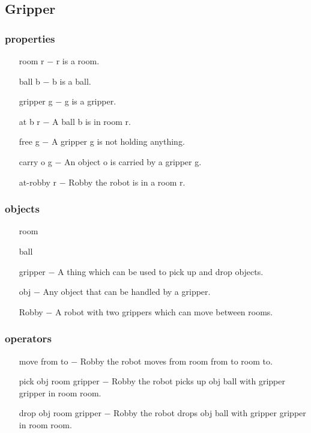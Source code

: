 \documentclass[a4paper]{article}
\begin{document}
\subsection*{Gripper}
\subsubsection*{properties}
\begin{itemize}
\item [room r $-$] r is a room.
\item [ball b $-$] b is a ball.
\item [gripper g $-$] g is a gripper.
\item[at b r $-$] A ball b is in room r.
\item[free g $-$] A gripper g is not holding anything.
\item[carry o g $-$] An object o is carried by a gripper g. 
\item[at-robby r $-$] Robby the robot is in a room r. %

\end{itemize}
\subsubsection*{objects}
\begin{itemize}
\item [room] 
\item [ball]
\item [gripper $-$] A thing which can be used to pick up and drop objects.
\item[obj $-$] Any object that can be handled by a gripper.
\item[Robby $-$] A robot with two grippers which can move between rooms.
\end{itemize}
\subsubsection*{operators}
\begin{itemize}
\item [move from to $-$] Robby the robot moves from room from to room to. 
\item [pick obj room gripper $-$] Robby the robot picks up obj ball with gripper gripper in room room.
\item [drop obj room gripper $-$] Robby the robot drops obj ball with gripper gripper in room room.


\end{itemize}
\end{document}
